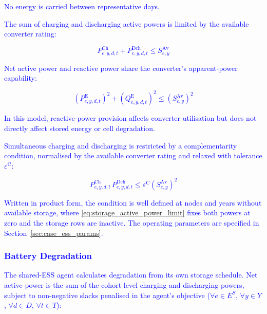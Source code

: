 \documentclass[preprint,12pt]{elsarticle}
\begin{document}
\textcolor{blue}{
    No energy is carried between representative days.  
}

\textcolor{blue}{
    The sum of charging and discharging active powers is limited by the available converter rating:
}

\textcolor{blue}{
    \begin{equation}
        P^{\text{Ch}}_{e,y,d,t}
        + P^{\text{Dch}}_{e,y,d,t}
        \le S^{\text{Av}}_{e,y}
        \label{eq:storage_active_power_limit}
    \end{equation}
}

\textcolor{blue}{
    Net active power and reactive power share the converter's apparent-power capability:
}

\textcolor{blue}{
    \begin{equation}
        \left(P^{\text{E}}_{e,y,d,t}\right)^2
        + \left(Q^{\text{E}}_{e,y,d,t}\right)^2
        \le \left(S^{\text{Av}}_{e,y}\right)^2
        \label{eq:converter_capability}
    \end{equation}
}

\textcolor{blue}{
    In this model, reactive-power provision affects converter utilisation but does not directly affect stored energy or cell degradation.
}

\textcolor{blue}{Simultaneous charging and discharging is restricted by a complementarity condition, normalised by the available converter rating and relaxed with tolerance $\varepsilon^{\text{C}}$:}

\textcolor{blue}{
    \begin{equation}
        P^{\text{Ch}}_{e,y,d,t}\, P^{\text{Dch}}_{e,y,d,t} \le \varepsilon^{\text{C}} \left(S^{\text{Av}}_{e,y}\right)^2
        \label{eq:network_complementarity}
    \end{equation}
}

\textcolor{blue}{
    Written in product form, the condition is well defined at nodes and years without available storage, where \eqref{eq:storage_active_power_limit} fixes both powers at zero and the storage rows are inactive.
    The operating parameters are specified in Section~\ref{sec:case_ess_params}.
}

\subsubsection{\textcolor{blue}{Battery Degradation}}

\textcolor{blue}{
    The shared-ESS agent calculates degradation from its own storage schedule. Net active power is the sum of the cohort-level charging and discharging powers, subject to non-negative slacks penalised in the agent's objective ($\forall e\in E^S$, $\forall y\in Y$, $\forall d\in D$, $\forall t\in T$):
}
\end{document}
